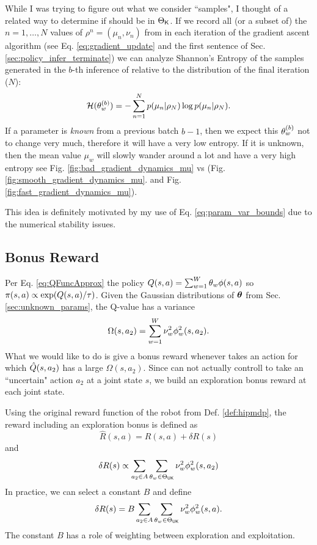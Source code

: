     \color{blue}
    While I was trying to figure out what we consider ``samples", I thought of a related way to determine if \paramElem
    should be in $\Theta_{\mathsf{K}}$. If we record all (or a subset of) the $n=1,\ldots,N$ values of $\rho^n = (\mu_n,
    \nu_n)$ from in each iteration of the gradient ascent algorithm (see Eq. \ref{eq:gradient_update} and the first
    sentence of Sec. \ref{sec:policy_infer_terminate}) we can analyze Shannon's Entropy of the samples generated in the
    $b$-th inference of  relative to the distribution of the final iteration ($N$):
    \[
    \mathcal{H}(\theta_{w}^{(b)}) = - \sum_{n=1}^{N} p(\mu_n| \rho_N)\log p(\mu_n|\rho_N).
    \]
    If a parameter is \emph{known} from a previous batch $b-1$, then we expect this $\theta_{w}^{(b)}$ not to change
    very much, therefore it will have a very low entropy. If it is unknown, then the mean value $\mu_w$ will slowly
    wander around a lot and have a very high entropy see Fig. \ref{fig:bad_gradient_dynamics_mu} vs (Fig.
    \ref{fig:smooth_gradient_dynamics_mu}.  and Fig. \ref{fig:fast_gradient_dynamics_mu}).

    \par
    This idea is definitely motivated by my use of Eq. \ref{eq:param_var_bounds} due to the numerical stability issues.
    \color{black}


\subsection{Bonus Reward}

    Per Eq. \ref{eq:QFuncApprox} the policy $Q(s,a) = \sum_{w=1}^{W} \theta_w \phi(s,a)$ so $\pi(s,a)\propto
    \exp(Q(s,a)/\tau)$. Given the Gaussian distributions of $\boldsymbol{\mathbb{\theta}}$ from Sec. \ref{sec:unknown_params}, the Q-value
    has a variance
    \[
    \Omega(s,a_2)=\sum_{w=1}^{W} \nu_w^2 \phi_w^2(s,a_2).
    \]
    What we would like to do is give  a bonus reward whenever  takes an action for which
    $\hat{Q}(s,a_2)$ has a large $\Omega(s,a_2)$. Since  can not actually controll  to take an
    ``uncertain" action $a_2$ at a joint state $s$, we build an exploration bonus reward at each joint state.

    Using the original reward function of the robot from Def. \ref{def:hipmdp}, the reward including an exploration
    bonus is defined as
    \[
    \hat R (s,a) = R(s,a) + \delta R(s)
    \]
    and
    \[\delta R(s)  \propto \sum_{a_2\in A}\sum_{\theta_w\in \Theta_{\mathsf{UK}}} \nu_w^2 \phi^2_w(s,a_2)
    \]
    In practice, we can select a constant $B$ and define
    \[
    \delta R(s) = B \sum_{a_2\in A}\sum_{\theta_w\in \Theta_{\mathsf{UK}}} \nu_w^2 \phi_w^2(s,a).
    \]
    The constant $B$ has a role of weighting between exploration and exploitation.

